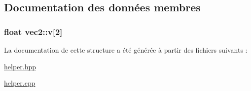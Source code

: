 \subsection{Documentation des données membres}
\hypertarget{structvec2_ae25758a321e69cf6f722589fca155735}{
\subsubsection[{v}]{\setlength{\rightskip}{0pt plus 5cm}float vec2\+::v\mbox{[}2\mbox{]}}}\label{structvec2_ae25758a321e69cf6f722589fca155735}


La documentation de cette structure a été générée à partir des fichiers suivants \+:\begin{DoxyCompactItemize}
\item 
\hyperlink{helper_8hpp}{helper.\+hpp}\item 
\hyperlink{helper_8cpp}{helper.\+cpp}\end{DoxyCompactItemize}
